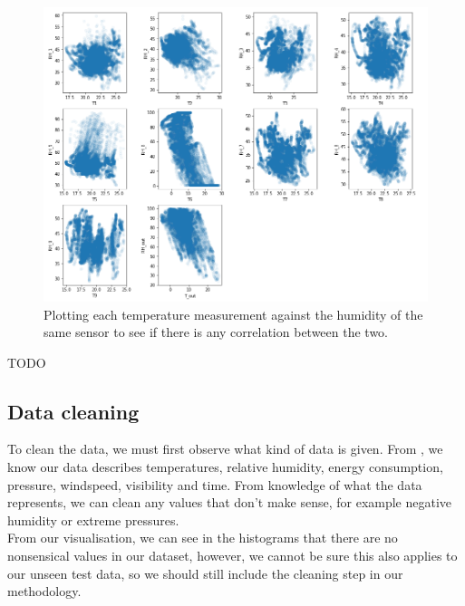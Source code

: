 \documentclass{article}
\newcommand{\n}[0]{\\[\baselineskip]}
\begin{document}
\begin{figure}[H]
\centering
\includegraphics[width=1\textwidth, keepaspectratio]{imgs/t-rh-correlation.png}
\caption{Plotting each temperature measurement against the humidity of the same sensor to see if there is any correlation between the two.}
\end{figure}

TODO \cite{colinear}

\subsection{Data cleaning}
To clean the data, we must first observe what kind of data is given. From \cite{paper}, we know our data describes temperatures, relative humidity, energy consumption, pressure, windspeed, visibility and time. From knowledge of what the data represents, we can clean any values that don't make sense, for example negative humidity or extreme pressures.
\n
From our visualisation, we can see in the histograms that there are no nonsensical values in our dataset, however, we cannot be sure this also applies to our unseen test data, so we should still include the cleaning step in our methodology.
\end{document}
